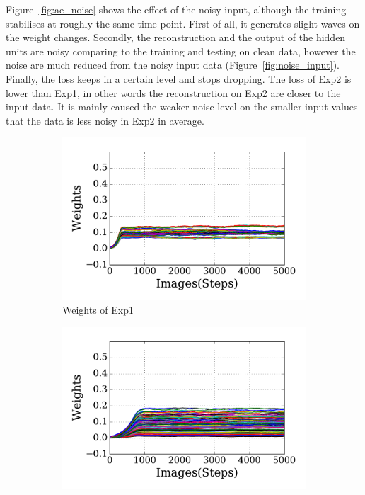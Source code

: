 Figure~\ref{fig:ae_noise} shows the effect of the noisy input, although the training stabilises at roughly the same time point.
First of all, it generates slight waves on the weight changes.
Secondly, the reconstruction and the output of the hidden units are noisy comparing to the training and testing on clean data, however the noise are much reduced from the noisy input data (Figure~\ref{fig:noise_input}). 
Finally, the loss keeps in a certain level and stops dropping.
The loss of Exp2 is lower than Exp1, in other words the reconstruction on Exp2 are closer to the input data.
It is mainly caused the weaker noise level on the smaller input values that the data is less noisy in Exp2 in average. 
\begin{figure}
	\centering
	\begin{subfigure}[t]{0.4\textwidth}
		\includegraphics[width=\textwidth]{pics_sdlm/30_exp_RBM/exp1_weights_non.pdf}
		\caption{Weights of Exp1}
	\end{subfigure}
	\begin{subfigure}[t]{0.4\textwidth}
		\includegraphics[width=\textwidth]{pics_sdlm/30_exp_RBM/exp2_weights_non.pdf}

\end{subfigure}
\end{figure}
